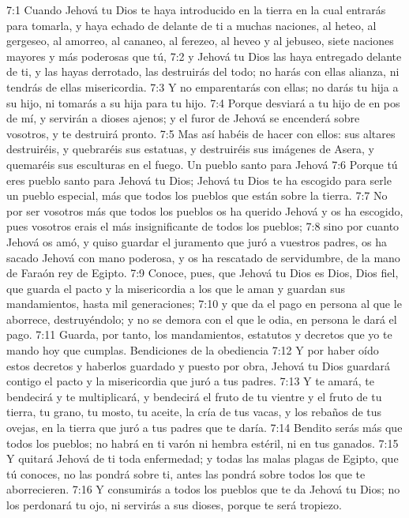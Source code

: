 7:1 Cuando Jehová tu Dios te haya introducido en la tierra en la cual entrarás para tomarla, y haya echado de delante de ti a muchas naciones, al heteo, al gergeseo, al amorreo, al cananeo, al ferezeo, al heveo y al jebuseo, siete naciones mayores y más poderosas que tú,  
7:2 y Jehová tu Dios las haya entregado delante de ti, y las hayas derrotado, las destruirás del todo; no harás con ellas alianza, ni tendrás de ellas misericordia.  
7:3 Y no emparentarás con ellas; no darás tu hija a su hijo, ni tomarás a su hija para tu hijo.  
7:4 Porque desviará a tu hijo de en pos de mí, y servirán a dioses ajenos; y el furor de Jehová se encenderá sobre vosotros, y te destruirá pronto.  
7:5 Mas así habéis de hacer con ellos: sus altares destruiréis, y quebraréis sus estatuas, y destruiréis sus imágenes de Asera, y quemaréis sus esculturas en el fuego.  
Un pueblo santo para Jehová  
7:6 Porque tú eres pueblo santo para Jehová tu Dios; Jehová tu Dios te ha escogido para serle un pueblo especial, más que todos los pueblos que están sobre la tierra.  
7:7 No por ser vosotros más que todos los pueblos os ha querido Jehová y os ha escogido, pues vosotros erais el más insignificante de todos los pueblos;  
7:8 sino por cuanto Jehová os amó, y quiso guardar el juramento que juró a vuestros padres, os ha sacado Jehová con mano poderosa, y os ha rescatado de servidumbre, de la mano de Faraón rey de Egipto.  
7:9 Conoce, pues, que Jehová tu Dios es Dios, Dios fiel, que guarda el pacto y la misericordia a los que le aman y guardan sus mandamientos, hasta mil generaciones;  
7:10 y que da el pago en persona al que le aborrece, destruyéndolo; y no se demora con el que le odia, en persona le dará el pago.  
7:11 Guarda, por tanto, los mandamientos, estatutos y decretos que yo te mando hoy que cumplas.  
Bendiciones de la obediencia   
7:12 Y por haber oído estos decretos y haberlos guardado y puesto por obra, Jehová tu Dios guardará contigo el pacto y la misericordia que juró a tus padres.  
7:13 Y te amará, te bendecirá y te multiplicará, y bendecirá el fruto de tu vientre y el fruto de tu tierra, tu grano, tu mosto, tu aceite, la cría de tus vacas, y los rebaños de tus ovejas, en la tierra que juró a tus padres que te daría.  
7:14 Bendito serás más que todos los pueblos; no habrá en ti varón ni hembra estéril, ni en tus ganados.  
7:15 Y quitará Jehová de ti toda enfermedad; y todas las malas plagas de Egipto, que tú conoces, no las pondrá sobre ti, antes las pondrá sobre todos los que te aborrecieren.  
7:16 Y consumirás a todos los pueblos que te da Jehová tu Dios; no los perdonará tu ojo, ni servirás a sus dioses, porque te será tropiezo.  
